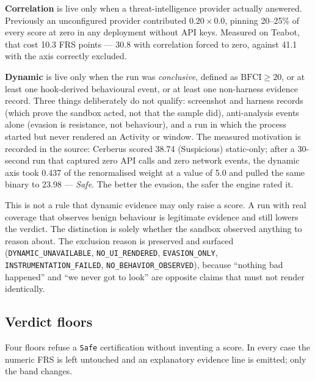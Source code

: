 \documentclass{article}
\begin{document}
\textbf{Correlation} is live only when a threat-intelligence provider actually
answered. Previously an unconfigured provider contributed $0.20 \times 0.0$,
pinning 20--25\% of every score at zero in any deployment without API keys.
Measured on Teabot, that cost 10.3 FRS points --- 30.8 with correlation forced
to zero, against 41.1 with the axis correctly excluded.

\textbf{Dynamic} is live only when the run was \emph{conclusive}, defined as
$\mathrm{BFCI} \ge 20$, or at least one hook-derived behavioural event, or at
least one non-harness evidence record. Three things deliberately do not qualify:
screenshot and harness records (which prove the sandbox acted, not that the
sample did), anti-analysis events alone (evasion is resistance, not behaviour),
and a run in which the process started but never rendered an Activity or window.
The measured motivation is recorded in the source: Cerberus scored 38.74
(Suspicious) static-only; after a 30-second run that captured zero API calls and
zero network events, the dynamic axis took 0.437 of the renormalised weight at a
value of 5.0 and pulled the same binary to 23.98 --- \emph{Safe}. The better the
evasion, the safer the engine rated it.

This is not a rule that dynamic evidence may only raise a score. A run with real
coverage that observes benign behaviour is legitimate evidence and still lowers
the verdict. The distinction is solely whether the sandbox observed anything to
reason about. The exclusion reason is preserved and surfaced
(\texttt{DYNAMIC\_UNAVAILABLE}, \texttt{NO\_UI\_RENDERED},
\texttt{EVASION\_ONLY}, \texttt{INSTRUMENTATION\_FAILED},
\texttt{NO\_BEHAVIOR\_OBSERVED}), because ``nothing bad happened'' and ``we
never got to look'' are opposite claims that must not render identically.

\subsection{Verdict floors}
\label{ssec:floors}

Four floors refuse a \texttt{Safe} certification without inventing a score. In
every case the numeric FRS is left untouched and an explanatory evidence line is
emitted; only the band changes.
\end{document}
